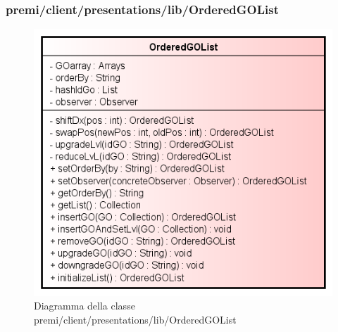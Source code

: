 \subsubsection{premi/client/presentations/lib/OrderedGOList}
\begin{figure}[h]
\begin{center}
\includegraphics[scale=0.90]{img/diacla/OrderedGOList.png}
\caption{Diagramma della classe premi/client/presentations/lib/OrderedGOList}
\end{center}
\end{figure}


